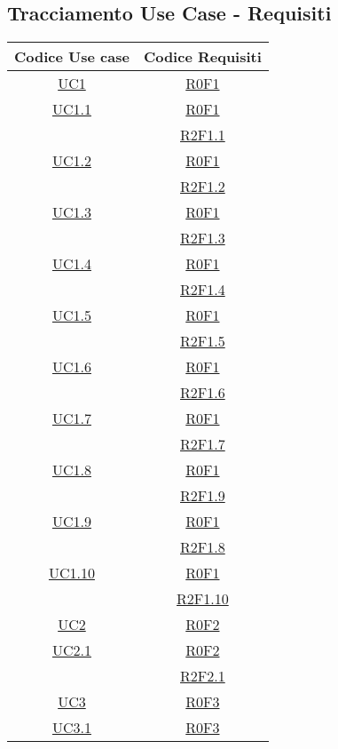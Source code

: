 \subsection{Tracciamento Use Case - Requisiti}
\normalsize
\begin{longtable}{|c|c|}
\hline
\textbf{Codice Use case} & \textbf{Codice Requisiti} \\
\hline
\endhead
\hyperlink{UC1}{UC1} & \hyperlink{R0F1}{R0F1}\\
\hline
\hyperlink{UC1.1}{UC1.1} & \hyperlink{R0F1}{R0F1}\\
& \hyperlink{R2F1.1}{R2F1.1}\\
\hline
\hyperlink{UC1.2}{UC1.2} & \hyperlink{R0F1}{R0F1}\\
& \hyperlink{R2F1.2}{R2F1.2}\\
\hline
\hyperlink{UC1.3}{UC1.3} & \hyperlink{R0F1}{R0F1}\\
& \hyperlink{R2F1.3}{R2F1.3}\\
\hline
\hyperlink{UC1.4}{UC1.4} & \hyperlink{R0F1}{R0F1}\\
& \hyperlink{R2F1.4}{R2F1.4}\\
\hline
\hyperlink{UC1.5}{UC1.5} & \hyperlink{R0F1}{R0F1}\\
& \hyperlink{R2F1.5}{R2F1.5}\\
\hline
\hyperlink{UC1.6}{UC1.6} & \hyperlink{R0F1}{R0F1}\\
& \hyperlink{R2F1.6}{R2F1.6}\\
\hline
\hyperlink{UC1.7}{UC1.7} & \hyperlink{R0F1}{R0F1}\\
& \hyperlink{R2F1.7}{R2F1.7}\\
\hline
\hyperlink{UC1.8}{UC1.8} & \hyperlink{R0F1}{R0F1}\\
& \hyperlink{R2F1.9}{R2F1.9}\\
\hline
\hyperlink{UC1.9}{UC1.9} & \hyperlink{R0F1}{R0F1}\\
& \hyperlink{R2F1.8}{R2F1.8}\\
\hline
\hyperlink{UC1.10}{UC1.10} & \hyperlink{R0F1}{R0F1}\\
& \hyperlink{R2F1.10}{R2F1.10}\\
\hline
\hyperlink{UC2}{UC2} & \hyperlink{R0F2}{R0F2}\\
\hline
\hyperlink{UC2.1}{UC2.1} & \hyperlink{R0F2}{R0F2}\\
& \hyperlink{R2F2.1}{R2F2.1}\\
\hline
\hyperlink{UC3}{UC3} & \hyperlink{R0F3}{R0F3}\\
\hline
\hyperlink{UC3.1}{UC3.1} & \hyperlink{R0F3}{R0F3}\\

\end{longtable}
